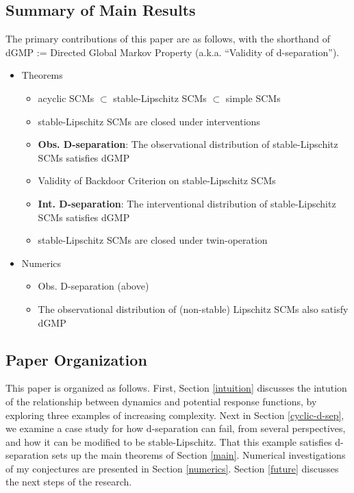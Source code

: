 \documentclass[letterpaper,10pt]{article}
\begin{document}

\newpage
\subsection{Summary of Main Results}

The primary contributions of this paper are as follows, with the shorthand of dGMP := Directed Global Markov Property (a.k.a. “Validity of d-separation”).

\begin{itemize}
  \item Theorems
  \begin{itemize}
    \item acyclic SCMs $\subset$ stable-Lipschitz SCMs $\subset$ simple SCMs
    \item stable-Lipschitz SCMs are closed under interventions
    \item \textbf{Obs. D-separation}: The observational distribution of stable-Lipschitz SCMs satisfies dGMP
    \item Validity of Backdoor Criterion on stable-Lipschitz SCMs
    \item \textbf{Int. D-separation}: The interventional distribution of stable-Lipschitz SCMs satisfies dGMP
    \item stable-Lipschitz SCMs are closed under twin-operation

  \end{itemize}
  \item Numerics
  \begin{itemize}
    \item Obs. D-separation (above)
    \item The observational distribution of (non-stable) Lipschitz SCMs also satisfy dGMP
  \end{itemize}
\end{itemize}

\subsection{Paper Organization}
This paper is organized as follows. 
First, Section \ref{intuition} discusses the intution of the relationship between dynamics and potential response functions, by exploring three examples of increasing complexity.
Next in Section \ref{cyclic-d-sep}, we examine a case study for how d-separation can fail, from several perspectives, and how it can be modified to be stable-Lipschitz. 
That this example satisfies d-separation sets up the main theorems of Section \ref{main}.
Numerical investigations of my conjectures are presented in Section \ref{numerics}. 
Section \ref{future} discusses the next steps of the research.
\end{document}
